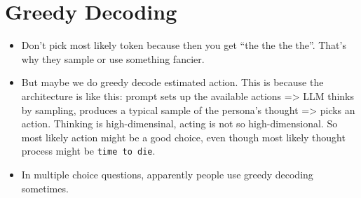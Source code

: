 \documentclass[11pt]{article}
\begin{document}
\section{Greedy Decoding}

\begin{itemize}
    \item Don't pick most likely token because then you get ``the the the the''. That's why they sample or use something fancier.
    \item But maybe we do greedy decode estimated action. This is because the architecture is like this: prompt sets up the available actions => LLM thinks by sampling, produces a typical sample of the persona's thought => picks an action. Thinking is high-dimensinal, acting is not so high-dimensional. So most likely action might be a good choice, even though most likely thought process might be \texttt{time to die}.
    \item In multiple choice questions, apparently people use greedy decoding sometimes.
\end{itemize}
\end{document}
